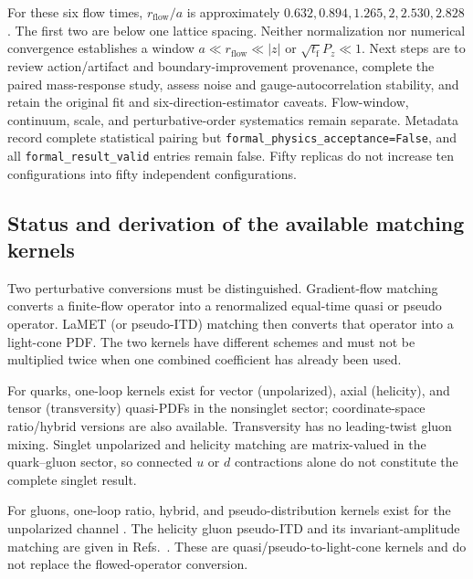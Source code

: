 \documentclass[11pt]{article}
\numberwithin{equation}{section}
\newcommand{\rflow}{r_{\mathrm{flow}}}
\newcommand{\tf}{t_{\mathrm f}}
\begin{document}
For these six flow times, \(\rflow/a\) is approximately
\(0.632,0.894,1.265,2,2.530,2.828\). The first two are below one lattice
spacing. Neither normalization nor numerical convergence establishes a
window \(a\ll\rflow\ll|z|\) or \(\sqrt{\tf}P_z\ll1\).
Next steps are to review action/artifact and boundary-improvement provenance,
complete the paired mass-response study, assess noise and gauge-autocorrelation
stability, and retain the original fit and six-direction-estimator caveats.
Flow-window, continuum, scale, and perturbative-order systematics remain
separate. Metadata record complete statistical pairing but
\texttt{formal\_physics\_acceptance=False}, and all
\texttt{formal\_result\_valid} entries remain false. Fifty replicas do not
increase ten configurations into fifty independent configurations.

\subsection{Status and derivation of the available matching kernels}
\label{sec:matching-status}

Two perturbative conversions must be distinguished.  Gradient-flow matching
converts a finite-flow operator into a renormalized equal-time quasi or pseudo
operator.  LaMET (or pseudo-ITD) matching then converts that operator into a
light-cone PDF.  The two kernels have different schemes and must not be
multiplied twice when one combined coefficient has already been used.

For quarks, one-loop kernels exist for vector (unpolarized), axial
(helicity), and tensor (transversity) quasi-PDFs in the nonsinglet sector;
coordinate-space ratio/hybrid versions are also available.  Transversity has
no leading-twist gluon mixing.  Singlet unpolarized and helicity matching are
matrix-valued in the quark--gluon sector, so connected $u$ or $d$ contractions
alone do not constitute the complete singlet result.

For gluons, one-loop ratio, hybrid, and pseudo-distribution kernels exist for
the unpolarized channel \cite{KhanEtAl2021UnpolarizedGluon,BalitskyMorrisRadyushkin2022,ChenEtAl2025GluonPDF}.
The helicity gluon pseudo-ITD and its invariant-amplitude matching are given
in Refs.~\cite{EgererEtAl2022GluonHelicity,BalitskyMorrisRadyushkin2022}.
These are quasi/pseudo-to-light-cone kernels and do not replace the
flowed-operator conversion.
\end{document}
